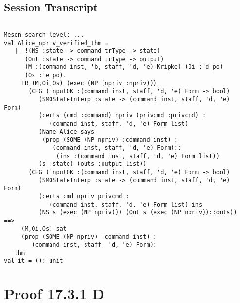 \documentclass{report}
\begin{document}
\subsection{Session Transcript}
\label{trans3}
\begin{session}
  \begin{scriptsize}
\begin{verbatim}

Meson search level: ...
val Alice_npriv_verified_thm =
   |- !(NS :state -> command trType -> state)
      (Out :state -> command trType -> output)
      (M :(command inst, 'b, staff, 'd, 'e) Kripke) (Oi :'d po)
      (Os :'e po).
     TR (M,Oi,Os) (exec (NP (npriv :npriv)))
       (CFG (inputOK :(command inst, staff, 'd, 'e) Form -> bool)
          (SM0StateInterp :state -> (command inst, staff, 'd, 'e) Form)
          (certs (cmd :command) npriv (privcmd :privcmd) :
             (command inst, staff, 'd, 'e) Form list)
          (Name Alice says
           (prop (SOME (NP npriv) :command inst) :
              (command inst, staff, 'd, 'e) Form)::
               (ins :(command inst, staff, 'd, 'e) Form list))
          (s :state) (outs :output list))
       (CFG (inputOK :(command inst, staff, 'd, 'e) Form -> bool)
          (SM0StateInterp :state -> (command inst, staff, 'd, 'e) Form)
          (certs cmd npriv privcmd :
             (command inst, staff, 'd, 'e) Form list) ins
          (NS s (exec (NP npriv))) (Out s (exec (NP npriv))::outs)) ==>
     (M,Oi,Os) sat
     (prop (SOME (NP npriv) :command inst) :
        (command inst, staff, 'd, 'e) Form):
   thm
val it = (): unit

\end{verbatim}
  \end{scriptsize}
\end{session}

\section{Proof 17.3.1 D}
\label{proof-4}
\end{document}
